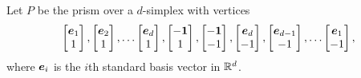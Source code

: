     Let \(P\) be the prism over a \(d\)-simplex with vertices
        \begin{align*}
            \begin{bmatrix} \bm{e}_1     \\ 1    \end{bmatrix},
            \begin{bmatrix} \bm{e}_2     \\ 1    \end{bmatrix},
            \dotsc
            \begin{bmatrix} \bm{e}_d     \\ 1    \end{bmatrix},
            \begin{bmatrix} -\bm{1}      \\ 1    \end{bmatrix},
            \begin{bmatrix} -\bm{1}      \\ -1   \end{bmatrix},
            \begin{bmatrix} \bm{e}_d     \\ -1   \end{bmatrix},
            \begin{bmatrix} \bm{e}_{d-1} \\ -1   \end{bmatrix},
            \dotsc
            \begin{bmatrix} \bm{e}_1     \\ -1   \end{bmatrix},
        \end{align*}
    where \(\bm{e}_i\) is the \(i\)th standard basis vector in \(\mathbb{R}^{d}\).

